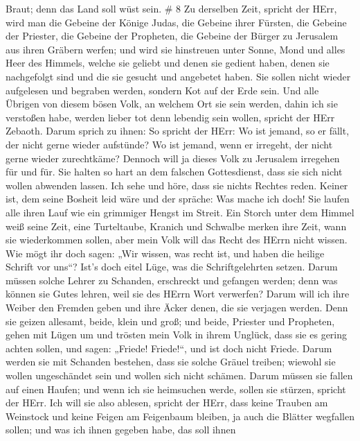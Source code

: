 Braut; denn das Land soll wüst sein. \# 8  Zu derselben
Zeit, spricht der HErr, wird man die Gebeine der Könige Judas, die
Gebeine ihrer Fürsten, die Gebeine der Priester, die Gebeine der
Propheten, die Gebeine der Bürger zu Jerusalem aus ihren Gräbern werfen;
 und wird sie hinstreuen unter Sonne, Mond und alles Heer
des Himmels, welche sie geliebt und denen sie gedient haben, denen sie
nachgefolgt sind und die sie gesucht und angebetet haben. Sie sollen
nicht wieder aufgelesen und begraben werden, sondern Kot auf der Erde
sein.  Und alle Übrigen von diesem bösen Volk, an welchem
Ort sie sein werden, dahin ich sie verstoßen habe, werden lieber tot
denn lebendig sein wollen, spricht der HErr Zebaoth.  Darum
sprich zu ihnen: So spricht der HErr: Wo ist jemand, so er fällt, der
nicht gerne wieder aufstünde? Wo ist jemand, wenn er irregeht, der nicht
gerne wieder zurechtkäme?  Dennoch will ja dieses Volk zu
Jerusalem irregehen für und für. Sie halten so hart an dem falschen
Gottesdienst, dass sie sich nicht wollen abwenden lassen. 
Ich sehe und höre, dass sie nichts Rechtes reden. Keiner ist, dem seine
Bosheit leid wäre und der spräche: Was mache ich doch! Sie laufen alle
ihren Lauf wie ein grimmiger Hengst im Streit.  Ein Storch
unter dem Himmel weiß seine Zeit, eine Turteltaube, Kranich und Schwalbe
merken ihre Zeit, wann sie wiederkommen sollen, aber mein Volk will das
Recht des HErrn nicht wissen.  Wie mögt ihr doch sagen: „Wir
wissen, was recht ist, und haben die heilige Schrift vor uns``? Ist's
doch eitel Lüge, was die Schriftgelehrten setzen.  Darum
müssen solche Lehrer zu Schanden, erschreckt und gefangen werden; denn
was können sie Gutes lehren, weil sie des HErrn Wort verwerfen?
 Darum will ich ihre Weiber den Fremden geben und ihre
Äcker denen, die sie verjagen werden. Denn sie geizen allesamt, beide,
klein und groß; und beide, Priester und Propheten, gehen mit Lügen um
 und trösten mein Volk in ihrem Unglück, dass sie es gering
achten sollen, und sagen: „Friede! Friede!{}``, und ist doch nicht
Friede.  Darum werden sie mit Schanden bestehen, dass sie
solche Gräuel treiben; wiewohl sie wollen ungeschändet sein und wollen
sich nicht schämen. Darum müssen sie fallen auf einen Haufen; und wenn
ich sie heimsuchen werde, sollen sie stürzen, spricht der HErr.
 Ich will sie also ablesen, spricht der HErr, dass keine
Trauben am Weinstock und keine Feigen am Feigenbaum bleiben, ja auch die
Blätter wegfallen sollen; und was ich ihnen gegeben habe, das soll ihnen
